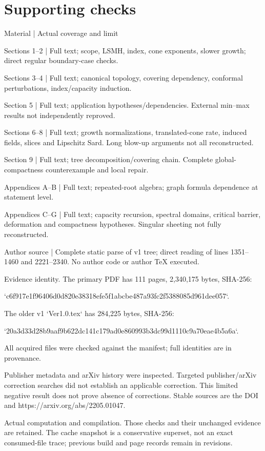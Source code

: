 \documentclass[10pt]{article}
\begin{document}
\section*{Supporting checks}
Material | Actual coverage and limit\par
Sections 1–2 | Full text; scope, LSMH, index, cone exponents, slower growth; direct regular boundary-case checks.\par
Sections 3–4 | Full text; canonical topology, covering dependency, conformal perturbations, index/capacity induction.\par
Section 5 | Full text; application hypotheses/dependencies. External min–max results not independently reproved.\par
Sections 6–8 | Full text; growth normalizations, translated-cone rate, induced fields, slices and Lipschitz Sard. Long blow-up arguments not all reconstructed.\par
Section 9 | Full text; tree decomposition/covering chain. Complete global-compactness counterexample and local repair.\par
Appendices A–B | Full text; repeated-root algebra; graph formula dependence at statement level.\par
Appendices C–G | Full text; capacity recursion, spectral domains, critical barrier, deformation and compactness hypotheses. Singular sheeting not fully reconstructed.\par
Author source | Complete static parse of v1 tree; direct reading of lines 1351–1460 and 2221–2340. No author code or author TeX executed.\par
Evidence identity. The primary PDF has 111 pages, 2,340,175 bytes, SHA-256:\par
`c6f917e1f96406d0d820e38318efe5f1abcbe487a93fc2f5388085d961dee057`.\par
The older v1 `Ver1.0.tex` has 284,225 bytes, SHA-256:\par
`20a3d33d28b9aaf9b622dc141c179ad0e860993b3dc99d1110c9a70eae4b5a6a`.\par
All acquired files were checked against the manifest; full identities are in provenance.\par
Publisher metadata and arXiv history were inspected. Targeted publisher/arXiv correction searches did not establish an applicable correction. This limited negative result does not prove absence of corrections. Stable sources are the DOI and https://arxiv.org/abs/2205.01047.\par
Actual computation and compilation. Those checks and their unchanged evidence are retained. The cache snapshot is a conservative superset, not an exact consumed-file trace; previous build and page records remain in revisions.\par
\end{document}
